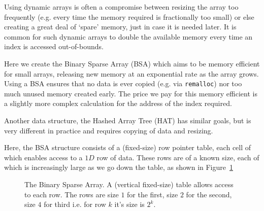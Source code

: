 \label{ex:bsa}

Using dynamic arrays is often a compromise between resizing the array too
frequently (e.g. every time the memory required is fractionally too
small) or else creating a great deal of `spare' memory, just in case
it is needed later.  It is common for such dynamic arrays to double the
available memory every time an index is accessed out-of-bounds.

\noindent Here we create the Binary Sparse Array (BSA) which aims to be
memory efficient for small arrays, releasing new memory at an exponential
rate as the array grows.  Using a BSA ensures that no data is ever copied
(e.g. via \verb^remalloc^) nor too much unused memory created early.
The price we pay for this memory efficient is a slightly more complex
calculation for the address of the index required.

Another data structure, the Hashed Array Tree (HAT) has similar goals, but
is very different in practice and requires copying of data and resizing.

Here, the BSA structure consists of a (fixed-size) row pointer table, each cell of which
enables access to a $1D$ row of data. These rows are of a known size,
each of which is increasingly large as we go down the table, as shown
in Figure~\ref{fig:bsa1}

\begin{figure}[ht]
\caption{The Binary Sparse Array. A (vertical fixed-size) table allows access to each row. The rows
are size $1$ for the first, size $2$ for the second, size $4$ for third i.e. for row $k$ it's size is $2^{k}$.}
\label{fig:bsa1}
\end{figure}

